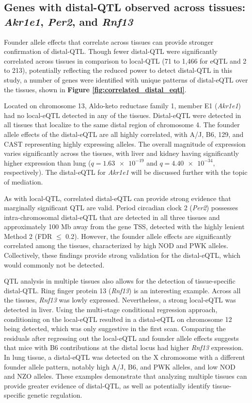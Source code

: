 \subsection{Genes with distal-QTL observed across tissues: \textit{Akr1e1}, \textit{Per2}, and \textit{Rnf13}}

Founder allele effects that correlate across tissues can provide stronger confirmation of distal-QTL. Though fewer distal-QTL were significantly correlated across tissues in comparison to local-QTL (71 to 1,466 for eQTL and 2 to 213), potentially reflecting the reduced power to detect distal-QTL in this study, a number of genes were identified with unique patterns of distal-eQTL over the tissues, shown in \textbf{Figure \ref{fig:correlated_distal_eqtl}}.

Located on chromosome 13, Aldo-keto reductase family 1, member E1 (\textit{Akr1e1}) had no local-eQTL detected in any of the tissues. Distal-eQTL were detected in all tissues that localize to the same distal region of chromosome 4. The founder allele effects of the distal-eQTL are all highly correlated, with A/J, B6, 129, and CAST representing highly expressing alleles. The overall magnitude of expression varies significantly across the tissues, with liver and kidney having significantly higher expression than lung ($q = \num{1.63e-19}$ and $q = \num{4.40e-34}$, respectively). The distal-eQTL for \textit{Akr1e1} will be discussed further with the topic of mediation.

As with local-QTL, correlated distal-eQTL can provide strong evidence that marginally significant QTL are valid. Period circadian clock 2 (\textit{Per2}) possesses intra-chromosomal distal-eQTL that are detected in all three tissues and approximately 100 Mb away from the gene TSS, detected with the highly lenient Method 2 (FDR $\leq$ 0.2). However, the founder allele effects are significantly correlated among the tissues, characterized by high NOD and PWK alleles. Collectively, these findings provide strong validation for the distal-eQTL, which would commonly not be detected.

QTL analysis in multiple tissues also allows for the detection of tissue-specific distal-QTL. Ring finger protein 13 (\textit{Rnf13}) is an interesting example. Across all the tissues, \textit{Rnf13} was lowly expressed. Nevertheless, a strong local-eQTL was detected in liver. Using the multi-stage conditional regression approach, conditioning on the local-eQTL resulted in a distal-eQTL on chromosome 12 being detected, which was only suggestive in the first scan. Comparing the residuals after regressing out the local-eQTL and founder allele effects suggests that mice with B6 contributions at the distal locus had higher \textit{Rnf13} expression. In lung tissue, a distal-eQTL was detected on the X chromosome with a different founder allele pattern, notably high A/J, B6, and PWK alleles, and low NOD and NZO alleles. These examples demonstrate that analyzing multiple tissues can provide greater evidence of distal-QTL, as well as potentially identify tissue-specific genetic regulation.

